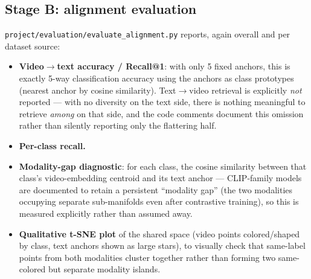 \documentclass[11pt]{article}
\begin{document}
\subsection{Stage B: alignment evaluation}
\texttt{project/evaluation/evaluate\_alignment.py} reports, again overall and per dataset source:
\begin{itemize}
  \item \textbf{Video$\to$text accuracy / Recall@1}: with only 5 fixed anchors, this is exactly
  5-way classification accuracy using the anchors as class prototypes (nearest anchor by cosine
  similarity). Text$\to$video retrieval is explicitly \emph{not} reported --- with no diversity on
  the text side, there is nothing meaningful to retrieve \emph{among} on that side, and the code
  comments document this omission rather than silently reporting only the flattering half.
  \item \textbf{Per-class recall.}
  \item \textbf{Modality-gap diagnostic}: for each class, the cosine similarity between that
  class's video-embedding centroid and its text anchor --- CLIP-family models are documented to
  retain a persistent ``modality gap'' (the two modalities occupying separate sub-manifolds even
  after contrastive training), so this is measured explicitly rather than assumed away.
  \item \textbf{Qualitative t-SNE plot} of the shared space (video points colored/shaped by class,
  text anchors shown as large stars), to visually check that same-label points from both
  modalities cluster together rather than forming two same-colored but separate modality islands.
\end{itemize}
\end{document}
